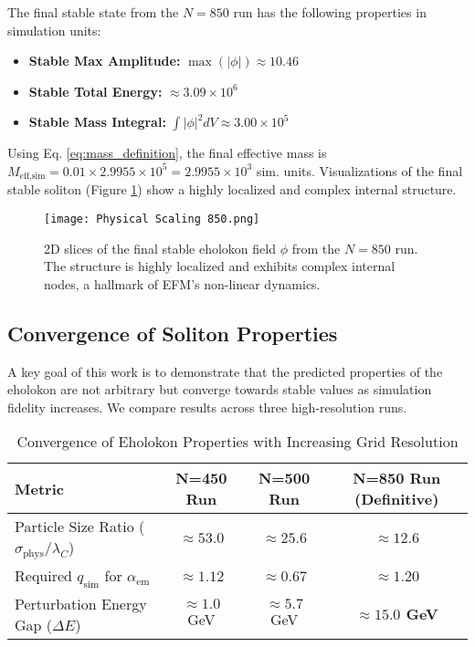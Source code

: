 \documentclass[11pt]{article}
\begin{document}
The final stable state from the \(N=850\) run has the following properties in simulation units:
\begin{itemize}
    \item \textbf{Stable Max Amplitude:} \(\max(|\phi|) \approx 10.46\)
    \item \textbf{Stable Total Energy:} \(\approx 3.09 \times 10^6\)
    \item \textbf{Stable Mass Integral:} \(\int|\phi|^2dV \approx 3.00 \times 10^5\)
\end{itemize}
Using Eq. \ref{eq:mass_definition}, the final effective mass is \(M_{\text{eff,sim}} = 0.01 \times 2.9955 \times 10^5 = 2.9955 \times 10^3\) sim. units. Visualizations of the final stable soliton (Figure \ref{fig:soliton_slices_zoomed}) show a highly localized and complex internal structure.

\begin{figure}[htbp]
    \centering
    \texttt{[image: Physical Scaling 850.png]}
    \caption{2D slices of the final stable eholokon field \(\phi\) from the \(N=850\) run. The structure is highly localized and exhibits complex internal nodes, a hallmark of EFM's non-linear dynamics.}
    \label{fig:soliton_slices_zoomed}
\end{figure}

\subsection{Convergence of Soliton Properties}
A key goal of this work is to demonstrate that the predicted properties of the eholokon are not arbitrary but converge towards stable values as simulation fidelity increases. We compare results across three high-resolution runs.

\begin{table}[ht]
    \centering
    \caption{Convergence of Eholokon Properties with Increasing Grid Resolution}
    \label{tab:convergence}
    \begin{tabular}{@{}lccc@{}}
        \toprule
        \textbf{Metric} & \textbf{N=450 Run} & \textbf{N=500 Run} & \textbf{N=850 Run (Definitive)} \\
        \midrule
        Particle Size Ratio (\(\sigma_{\text{phys}} / \lambda_C\)) & \(\approx 53.0\) & \(\approx 25.6\) & \textbf{\(\approx 12.6\)} \\
        Required \(q_{\text{sim}}\) for \(\alpha_{\text{em}}\) & \(\approx 1.12\) & \(\approx 0.67\) & \textbf{\(\approx 1.20\)} \\
        Perturbation Energy Gap (\(\Delta E\)) & \(\approx 1.0\) GeV & \(\approx 5.7\) GeV & \textbf{\(\approx 15.0\) GeV} \\
        \bottomrule
    \end{tabular}
\end{table}
\end{document}
